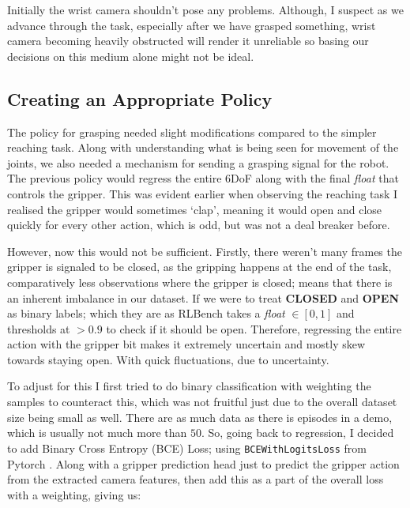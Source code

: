 
Initially the wrist camera shouldn't pose any problems. Although, I suspect as we advance through the task, especially after we have grasped something, wrist camera becoming heavily obstructed will render it unreliable so basing our decisions on this medium alone might not be ideal.

\subsection{Creating an Appropriate Policy}
The policy for grasping needed slight modifications compared to the simpler reaching task. Along with understanding what is being seen for movement of the joints, we also needed a mechanism for sending a grasping signal for the robot. The previous policy would regress the entire 6DoF along with the final \emph{float} that controls the gripper. This was evident earlier when observing the reaching task I realised the gripper would sometimes `clap', meaning it would open and close quickly for every other action, which is odd, but was not a deal breaker before.

However, now this would not be sufficient. Firstly, there weren't many frames the gripper is signaled to be closed, as the gripping happens at the end of the task, comparatively less observations where the gripper is closed; means that there is an inherent imbalance in our dataset. If we were to treat \textbf{CLOSED} and \textbf{OPEN} as binary labels; which they are as RLBench takes a \emph{float} $\in \left[0, 1\right]$ and thresholds at $ > 0.9$ to check if it should be open. Therefore, regressing the entire action with the gripper bit makes it extremely uncertain and mostly skew towards staying open. With quick fluctuations, due to uncertainty.

To adjust for this I first tried to do binary classification with weighting the samples to counteract this, which was not fruitful just due to the overall dataset size being small as well. There are as much data as there is episodes in a demo, which is usually not much more than $50$. So, going back to regression, I decided to add Binary Cross Entropy (BCE) Loss; using \verb|BCEWithLogitsLoss| from Pytorch . Along with a gripper prediction head just to predict the gripper action from the extracted camera features, then add this as a part of the overall loss with a weighting, giving us:

